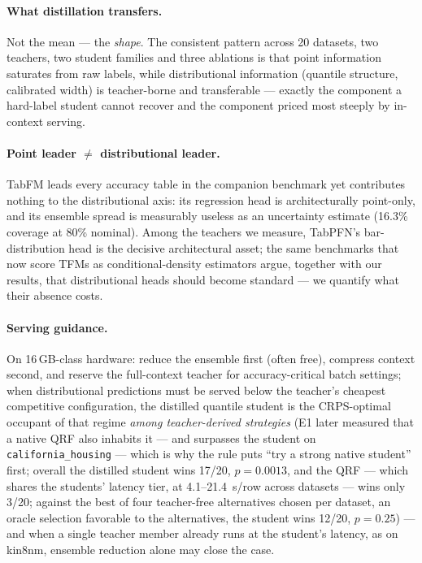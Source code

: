 \documentclass[11pt]{article}
\begin{document}
\paragraph{What distillation transfers.} Not the mean --- the \emph{shape}.
The consistent pattern across 20 datasets, two teachers, two student
families and three ablations is that point information saturates from raw
labels, while distributional information (quantile structure, calibrated
width) is teacher-borne and transferable --- exactly the component a
hard-label student cannot recover and the component priced most steeply by
in-context serving.

\paragraph{Point leader $\neq$ distributional leader.} TabFM leads every
accuracy table in the companion benchmark yet contributes nothing to the
distributional axis: its regression head is architecturally point-only, and
its ensemble spread is measurably useless as an uncertainty estimate
(16.3\% coverage at 80\% nominal). Among the teachers we measure,
TabPFN's bar-distribution head is the decisive architectural asset; the
same benchmarks that now score TFMs as conditional-density estimators
\citep{izbicki2026,landsgesell2026} argue, together with our results,
that distributional heads should become standard --- we quantify what
their absence costs.

\paragraph{Serving guidance.} On 16\,GB-class hardware: reduce the ensemble
first (often free), compress context second, and reserve the full-context
teacher for accuracy-critical batch settings; when distributional predictions must be served below the teacher's
cheapest competitive configuration, the distilled quantile student is
the CRPS-optimal occupant of that regime \emph{among teacher-derived
strategies} (E1 later measured that a native QRF also inhabits it ---
and surpasses the student on \texttt{california\_\allowbreak housing} --- which is
why the rule puts ``try a strong native student'' first; overall the
distilled student wins 17/20, $p=0.0013$, and the QRF --- which shares
the students' latency tier, at 4.1--21.4~\textmu s/row across datasets
--- wins only 3/20; against the best of four teacher-free
alternatives chosen per dataset, an oracle selection favorable to
the alternatives, the student wins 12/20, $p=0.25$) --- and when a
single teacher member already runs at the student's latency, as on
kin8nm, ensemble reduction alone may close the case.
\end{document}
